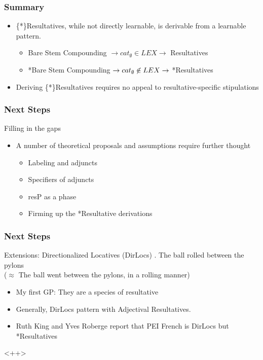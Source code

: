 \documentclass[Proposal]{subfiles}
\begin{document}
\begin{frame}
  \frametitle{Summary}
  \begin{itemize}[<+->]
    \item \{*\}Resultatives, while not directly learnable, is derivable from a learnable pattern.
      \begin{itemize}
	\item \checkmark Bare Stem Compounding $\rightarrow cat_\emptyset \in LEX \rightarrow$ \checkmark Resultatives
	\item *Bare Stem Compounding $\rightarrow cat_\emptyset \centernot\in LEX \rightarrow$ *Resultatives
      \end{itemize}
    \item Deriving \{*\}Resultatives requires no appeal to resultative-specific stipulations
  \end{itemize}
\end{frame}
\begin{frame}
  \frametitle{Next Steps}

  \begin{block}
    {Filling in the gaps}
    \begin{itemize}[<+->]
      \item A number of theoretical proposals and assumptions require further thought
	\begin{itemize}
	  \item Labeling and adjuncts
	  \item Specifiers of adjuncts
	  \item resP as a phase
	  \item Firming up the *Resultative derivations
	\end{itemize}
    \end{itemize}
  \end{block}
\end{frame}
\begin{frame}
  \frametitle{Next Steps}
  \begin{block}
    {Extensions: Directionalized Locatives (DirLocs)}
    \ex. {\rm The ball rolled between the pylons}\\
    ($\approx$ The ball went between the pylons, in a rolling manner)

    \pause
    \begin{itemize}[<+->]
      \item My first GP: They are a species of resultative
      \item Generally, DirLocs pattern with Adjectival Resultatives.
      \item Ruth King and Yves Roberge \parencite[p.c. to][]{rooryck1996prepositions} report that PEI French is \checkmark DirLocs but *Resultatives
    \end{itemize}
  \end{block}<++>
\end{frame}
\end{document}
